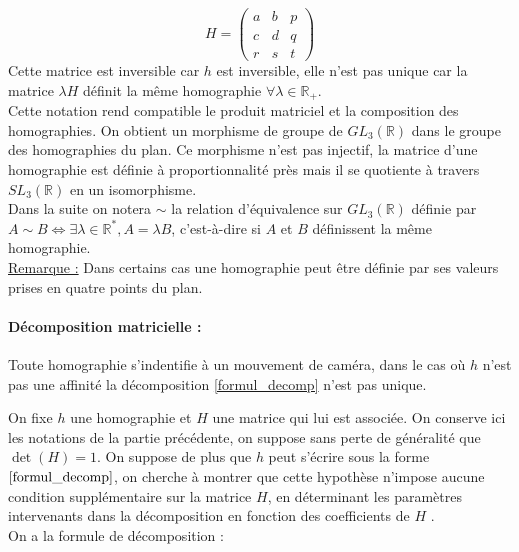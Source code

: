\begin{prop}
	\begin{equation*}
	H=\begin{pmatrix}
	a&b&p\\c&d&q\\r&s&t
	\end{pmatrix}
	\end{equation*}
	Cette matrice est inversible car $h$ est inversible, elle n'est pas unique car la matrice $\lambda H$ définit la même homographie $\forall \lambda \in \mathbb{R}_+$.\\
Cette notation rend compatible le produit matriciel et la composition des homographies. On obtient un morphisme de groupe de $GL_{3}(\mathbb{R})$ dans le groupe des homographies du plan. Ce morphisme n'est pas injectif, la matrice d'une homographie est définie à proportionnalité près mais il se quotiente à travers $SL_{3}(\mathbb{R})$ en un isomorphisme.\\
Dans la suite on notera $\sim$ la relation d'équivalence  sur $GL_{3}(\mathbb{R})$ définie par $A\sim B \iff \exists \lambda\in \mathbb{R}^{*} , A=\lambda B$, c'est-à-dire si $A$ et $B$ définissent la même homographie.\\
\underline{Remarque :} Dans certains cas une homographie peut être définie par ses valeurs prises en quatre points du plan.\\



\paragraph{Décomposition matricielle :}
\begin{prop}
Toute homographie s'indentifie à un mouvement de caméra, dans le cas où $h$ n'est pas une affinité  la décomposition \ref{formul_decomp} n'est pas unique.
\end{prop}
On fixe $h$ une homographie et $H$ une matrice qui lui est associée. On conserve ici les notations de la partie précédente, on suppose sans perte de généralité que $\det (H)=1$. On suppose de plus que $h$ peut s'écrire sous la forme $\ref{formul_decomp}$, on cherche à montrer que cette hypothèse n'impose aucune condition supplémentaire sur la matrice $H$, en déterminant les paramètres intervenants dans la décomposition en fonction des coefficients de $H$ .\\
On a la formule de décomposition :


\end{prop}
